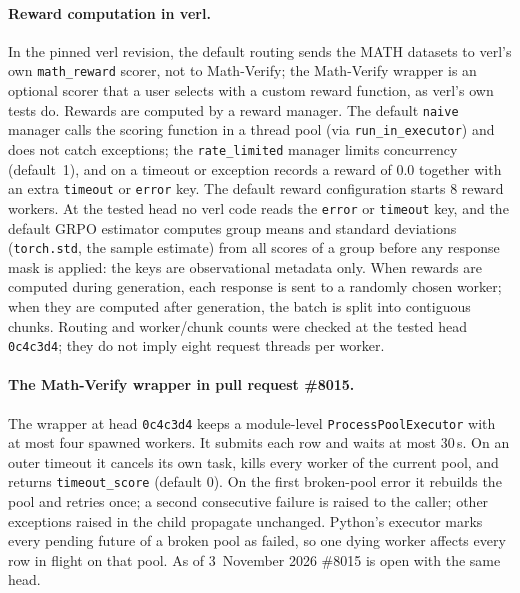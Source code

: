 \documentclass[10pt,a4paper]{article}
\newcommand{\mv}{Math-Verify}
\begin{document}
\paragraph{Reward computation in verl.}
In the pinned verl revision, the default routing sends the MATH datasets to
verl's own \texttt{math\_reward} scorer, not to \mv{}; the \mv{} wrapper is
an optional scorer that a user selects with a custom reward function, as
verl's own tests do. Rewards
are computed by a reward manager. The default \texttt{naive} manager calls
the scoring function in a thread pool (via \texttt{run\_in\_executor}) and does
not catch exceptions; the \texttt{rate\_limited} manager limits concurrency
(default~1), and on a timeout or exception records a reward of $0.0$ together
with an extra \texttt{timeout} or \texttt{error} key. The default reward
configuration starts 8 reward workers. At the tested head no verl code
reads the \texttt{error} or \texttt{timeout} key, and the default GRPO
estimator computes group means and standard deviations (\texttt{torch.std},
the sample estimate) from all scores of a group before any response mask is
applied: the keys are observational metadata only. When rewards are computed during
generation, each response is sent to a randomly chosen worker; when they are
computed after generation, the batch is split into contiguous chunks.
Routing and worker/chunk counts were checked at the tested head
\texttt{0c4c3d4}; they do not imply eight request threads per worker.

\paragraph{The \mv{} wrapper in pull request \#8015.}
The wrapper at head \texttt{0c4c3d4} keeps a module-level
\texttt{ProcessPoolExecutor} with at most four spawned workers. It submits
each row and waits at most 30\,s. On an outer timeout it cancels its own
task, kills every worker of the current pool, and returns
\texttt{timeout\_score} (default $0$). On the first broken-pool error it
rebuilds the pool and retries once; a second consecutive failure is raised
to the caller; other exceptions raised in the child propagate unchanged.
Python's executor marks every pending future of a broken pool
as failed, so one dying worker affects every row in flight on that pool.
As of 3~November 2026 \#8015 is open with the same head.
\end{document}
